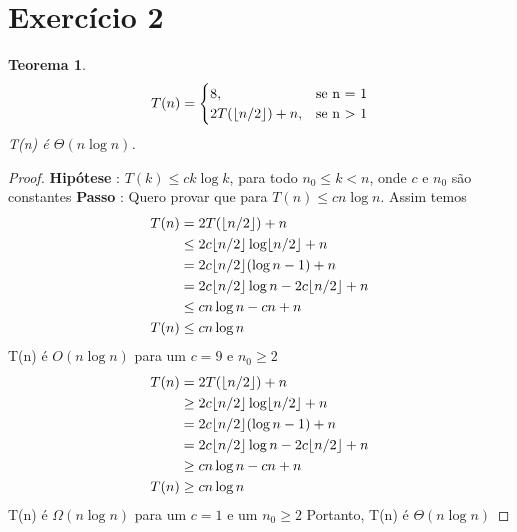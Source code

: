 \documentclass{article}
\DeclarePairedDelimiter\floor{\lfloor}{\rfloor}
\begin{document}
\section{Exercício 2}
\newtheorem{teo2}{Teorema}
\begin{teo2}
    \begin{equation}
        T(n)=\begin{cases}
        8, & \text{se n = 1}\\
        2T(\floor*{n/2}) + n, & \text{se n > 1}
    \end{cases}
    \end{equation}
    T(n) é $\Theta(n \log n)$.
\end{teo2}
\begin{proof}
    \hfill \break
    \textbf{Hipótese} : $T(k) \leq ck\log k$, para todo $n_0 \leq k < n$, onde $c$ e $n_0$ são constantes\newline
    \textbf{Passo} : Quero provar que para $T(n) \leq cn\log n$.\newline
    \hspace*{30pt} Assim temos \newline
    \begin{equation}
        \begin{split}
            T(n) &= 2T(\floor*{n/2}) + n \\
            & \leq 2c\floor*{n/2} \log \floor*{n/2} + n\\
            & = 2c\floor*{n/2} (\log n - 1) + n\\
            & = 2c\floor*{n/2}\log n - 2c\floor*{n/2} + n \\
            & \leq cn\log n - cn + n\\
            T(n) & \leq cn \log n
        \end{split}
    \end{equation}
    T(n) é $O(n\log n)$ para um $c = 9$ e $n_0 \geq 2$
    \begin{equation}
        \begin{split}
            T(n) &= 2T(\floor*{n/2}) + n \\
            & \geq 2c\floor*{n/2} \log \floor*{n/2} + n\\
            & = 2c\floor*{n/2} (\log n - 1) + n\\
            & = 2c\floor*{n/2}\log n - 2c\floor*{n/2} + n \\
            & \geq cn\log n - cn + n\\
            T(n) & \geq cn \log n
        \end{split}
    \end{equation}
    T(n) é $\Omega(n\log n)$ para um $c = 1$ e um $n_0 \geq 2$\newline
    Portanto, T(n) é $\Theta(n\log n)$
\end{proof}
\end{document}
